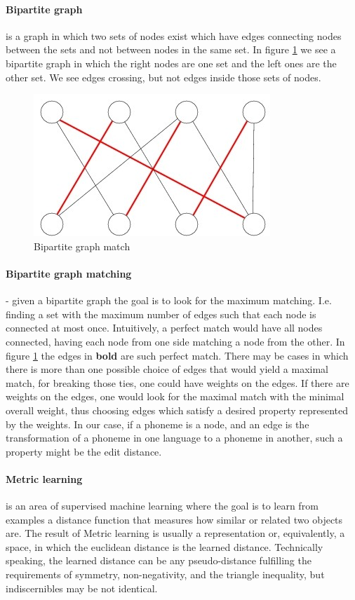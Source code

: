 \documentclass[letterpaper, 11pt]{article}
\begin{document}
\paragraph{Bipartite graph} is a graph in which two sets of nodes exist which have edges connecting nodes between the sets and not between nodes in the same set. In figure \ref{fig:bipartite} we see a bipartite graph in which the right nodes are one set and the left ones are the other set. We see edges crossing, but not edges inside those sets of nodes.

\begin{figure}
	\includegraphics[width=0.8\columnwidth]{Matching_pic_3_1_and_3_2}
	\caption{Bipartite graph match
		\label{fig:bipartite}
	}
\end{figure}
\paragraph{Bipartite graph matching} - given a bipartite graph the goal is to look for the maximum matching. I.e. finding a set with the maximum number of edges such that each node is connected at most once. Intuitively, a perfect match would have all nodes connected, having each node from one side matching a node from the other. In figure \ref{fig:bipartite} the edges in \textbf{bold} are such perfect match.
There may be cases in which there is more than one possible choice of edges that would yield a maximal match, for breaking those ties, one could have weights on the edges. If there are weights on the edges, one would look for the maximal match with the minimal overall weight, thus choosing edges which satisfy a desired property represented by the weights. In our case, if a phoneme is a node, and an edge is the transformation of a phoneme in one language to a phoneme in another, such a property might be the edit distance.
\paragraph{Metric learning} is an area of supervised machine learning where the goal is to learn from examples a distance function that measures how similar or related two objects are. The result of Metric learning is usually a representation or, equivalently, a space, in which the euclidean distance is the learned distance. Technically speaking, the learned distance can be any pseudo-distance fulfilling the requirements of symmetry, non-negativity, and the triangle inequality, but indiscernibles may be not identical.
\end{document}

